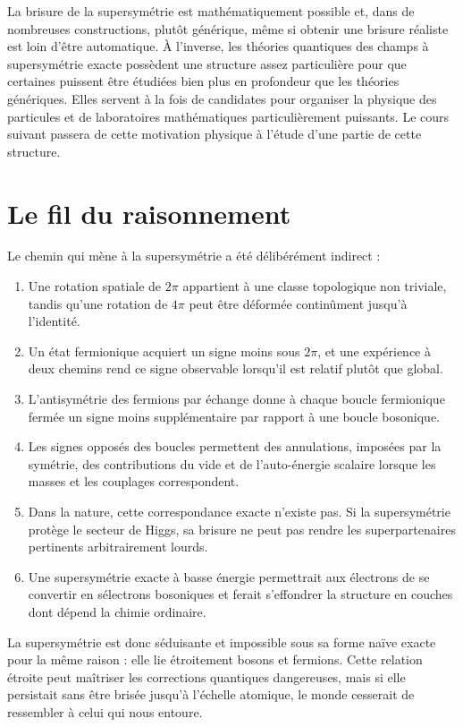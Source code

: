 La brisure de la supersymétrie est mathématiquement possible et, dans de nombreuses constructions, plutôt générique, même si obtenir une brisure réaliste est loin d’être automatique. À l’inverse, les théories quantiques des champs à supersymétrie exacte possèdent une structure assez particulière pour que certaines puissent être étudiées bien plus en profondeur que les théories génériques. Elles servent à la fois de candidates pour organiser la physique des particules et de laboratoires mathématiques particulièrement puissants. Le cours suivant passera de cette motivation physique à l’étude d’une partie de cette structure.

\section{Le fil du raisonnement}

Le chemin qui mène à la supersymétrie a été délibérément indirect :
\begin{enumerate}
\item Une rotation spatiale de \(2\pi\) appartient à une classe topologique non triviale, tandis qu’une rotation de \(4\pi\) peut être déformée continûment jusqu’à l’identité.
\item Un état fermionique acquiert un signe moins sous \(2\pi\), et une expérience à deux chemins rend ce signe observable lorsqu’il est relatif plutôt que global.
\item L’antisymétrie des fermions par échange donne à chaque boucle fermionique fermée un signe moins supplémentaire par rapport à une boucle bosonique.
\item Les signes opposés des boucles permettent des annulations, imposées par la symétrie, des contributions du vide et de l’auto-énergie scalaire lorsque les masses et les couplages correspondent.
\item Dans la nature, cette correspondance exacte n’existe pas. Si la supersymétrie protège le secteur de Higgs, sa brisure ne peut pas rendre les superpartenaires pertinents arbitrairement lourds.
\item Une supersymétrie exacte à basse énergie permettrait aux électrons de se convertir en sélectrons bosoniques et ferait s’effondrer la structure en couches dont dépend la chimie ordinaire.
\end{enumerate}

La supersymétrie est donc séduisante et impossible sous sa forme naïve exacte pour la même raison : elle lie étroitement bosons et fermions. Cette relation étroite peut maîtriser les corrections quantiques dangereuses, mais si elle persistait sans être brisée jusqu’à l’échelle atomique, le monde cesserait de ressembler à celui qui nous entoure.